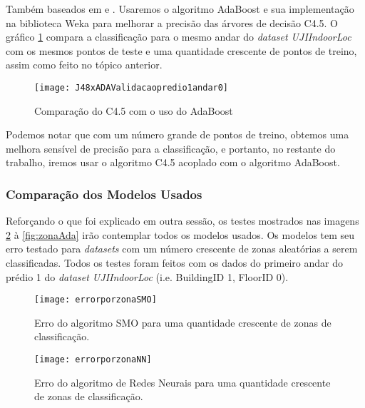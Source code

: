 Também baseados em \cite{comparative} e \cite{comparativeEN}. Usaremos o algoritmo AdaBoost  e sua implementação na biblioteca Weka para melhorar a precisão das árvores de decisão C4.5. O gráfico \ref{fig:comparisonC4.5andAdaBoost} compara a classificação para o mesmo andar do \textit{dataset UJIIndoorLoc} com os mesmos pontos de teste e uma quantidade crescente de pontos de treino, assim como feito no tópico anterior.


\begin{figure}[!h]
\centering
\caption{Comparação do C4.5 com o uso do AdaBoost}
 \texttt{[image: J48xADAValidacaopredio1andar0]}
\label{fig:comparisonC4.5andAdaBoost}  
\end{figure}


Podemos notar que com um número grande de pontos de treino, obtemos uma melhora sensível de precisão para a classificação, e portanto, no restante do trabalho, iremos usar o algoritmo C4.5 acoplado com o algoritmo AdaBoost.



\subsubsection{Comparação dos Modelos Usados}


Reforçando o que foi explicado em outra sessão, os testes mostrados nas imagens \ref{fig:zonaSMO} à \ref{fig:zonaAda} irão contemplar todos os modelos usados. Os modelos tem seu erro testado para \textit{datasets} com um número crescente de zonas aleatórias a serem classificadas. Todos os testes foram feitos com os dados do primeiro andar do prédio 1 do \textit{dataset UJIIndoorLoc }(i.e. BuildingID 1, FloorID 0).


\begin{figure}[H]
	\centering
	\caption{Erro do algoritmo SMO  para uma quantidade crescente de zonas de classificação.}
  \texttt{[image: errorporzonaSMO]}
\label{fig:zonaSMO}

\end{figure}



\begin{figure}[H]
	\centering
	\caption{Erro do algoritmo de Redes Neurais  para uma quantidade crescente de zonas de classificação.}
  \texttt{[image: errorporzonaNN]}
\label{fig:zonaNN}

\end{figure}


